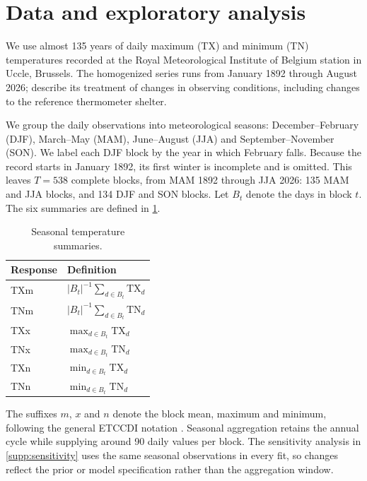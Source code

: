 \documentclass[11pt,a4paper]{article}
\begin{document}
	\section{Data and exploratory analysis}\label{sec:data}
	
	We use almost 135 years of daily maximum (TX) and minimum (TN)
	temperatures recorded at the Royal Meteorological Institute of Belgium
	station in Uccle, Brussels. The homogenized series runs from January
	1892 through August 2026; \citet{bertrand2018belhornet} describe its
	treatment of changes in observing conditions, including changes to
	the reference thermometer shelter.
	
	We group the daily observations into meteorological seasons:
	December--February (DJF), March--May (MAM), June--August (JJA) and
	September--November (SON). We label each DJF block by the year in
	which February falls. Because the record starts in January 1892, its
	first winter is incomplete and is omitted. This leaves \(T=538\)
	complete blocks, from MAM 1892 through JJA 2026: 135 MAM and JJA
	blocks, and 134 DJF and SON blocks. Let \(B_t\) denote the days in
	block \(t\). The six summaries are defined in \cref{tab:summaries}.
	
	\begin{table}[!htbp]
		\centering
		\small
		\caption{Seasonal temperature summaries.}
		\label{tab:summaries}
		\begin{tabular}{@{}ll@{}}
			\toprule
			Response & Definition \tabularnewline
			\midrule
			TXm & \( |B_t|^{-1}\sum_{d\in B_t}\mathrm{TX}_d \) \tabularnewline
			TNm & \( |B_t|^{-1}\sum_{d\in B_t}\mathrm{TN}_d \) \tabularnewline
			TXx & \( \max_{d\in B_t}\mathrm{TX}_d \) \tabularnewline
			TNx & \( \max_{d\in B_t}\mathrm{TN}_d \) \tabularnewline
			TXn & \( \min_{d\in B_t}\mathrm{TX}_d \) \tabularnewline
			TNn & \( \min_{d\in B_t}\mathrm{TN}_d \) \tabularnewline
			\bottomrule
		\end{tabular}
	\end{table}
	
	
	The suffixes \(m\), \(x\) and \(n\) denote the block mean, maximum and
	minimum, following the general ETCCDI notation
	\citep{expertteamonclimatechangedetectionandindicesetccdi2024}.
	Seasonal aggregation retains the annual cycle while supplying around
	90 daily values per block. The sensitivity analysis in \cref{supp:sensitivity} uses the same
	seasonal observations in every fit, so changes reflect the prior or
	model specification rather than the aggregation window.
	
\end{document}
